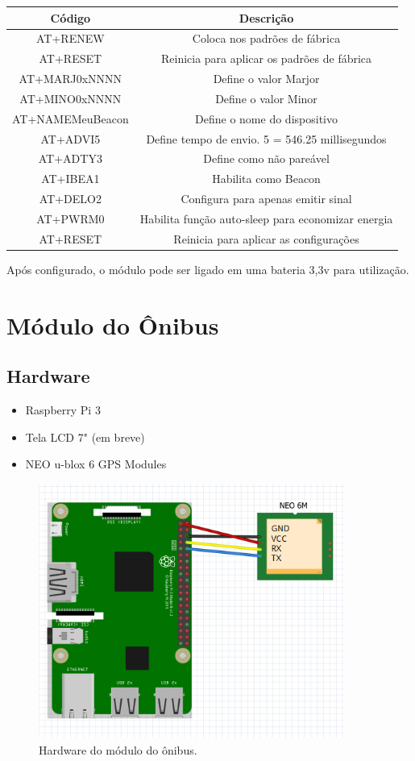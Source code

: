 \documentclass[
	12pt,				%
	oneside,			%
	a4paper,			%
	brazil				%
]{abntex2}
\begin{document}
{\begin{tabular}{|c|c|}
\hline 
Código & Descrição \\ 
\hline 
AT+RENEW & Coloca nos padrões de fábrica \\ 
\hline 
AT+RESET & Reinicia para aplicar os padrões de fábrica \\ 
\hline 
AT+MARJ0xNNNN & Define o valor Marjor \\ 
\hline 
AT+MINO0xNNNN & Define o valor Minor \\ 
\hline 
AT+NAMEMeuBeacon & Define o nome do dispositivo \\ 
\hline 
AT+ADVI5 & Define tempo de envio. 5 = 546.25 millisegundos \\ 
\hline 
AT+ADTY3 & Define como não pareável \\ 
\hline 
AT+IBEA1 & Habilita como Beacon \\ 
\hline 
AT+DELO2 & Configura para apenas emitir sinal \\ 
\hline 
AT+PWRM0 & Habilita função auto-sleep para economizar energia \\ 
\hline 
AT+RESET & Reinicia para aplicar as configurações \\ 
\hline 
\end{tabular} 

Após configurado, o módulo pode ser ligado em uma bateria 3,3v para utilização.

\newpage

\section{Módulo do Ônibus}

\subsection{Hardware}

\begin{itemize}
\item Raspberry Pi 3
\item Tela LCD 7" (em breve)
\item NEO u-blox 6 GPS Modules
\end{itemize}

\begin{figure}[H]
\centering
\includegraphics[width=10cm, center]{images/schematic-bus-module}
\caption{Hardware do módulo do ônibus.}
\label{Rotulo}
\end{figure}

}
\end{document}
